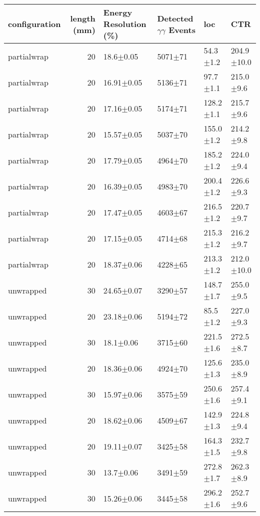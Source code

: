 \begin{tabular}{lrllll}
\hline
configuration &  length (mm) & Energy Resolution (\%) & Detected $\gamma\gamma$ Events &             loc &             CTR \\
\hline
  partialwrap &      20 &    18.6$\pm$0.05 &  5071$\pm$71 &    54.3$\pm$1.2 &  204.9$\pm$10.0 \\
  partialwrap &      20 &   16.91$\pm$0.05 &  5136$\pm$71 &    97.7$\pm$1.1 &   215.0$\pm$9.6 \\
  partialwrap &      20 &   17.16$\pm$0.05 &  5174$\pm$71 &   128.2$\pm$1.1 &   215.7$\pm$9.6 \\
  partialwrap &      20 &   15.57$\pm$0.05 &  5037$\pm$70 &   155.0$\pm$1.2 &   214.2$\pm$9.8 \\
  partialwrap &      20 &   17.79$\pm$0.05 &  4964$\pm$70 &   185.2$\pm$1.2 &   224.0$\pm$9.4 \\
  partialwrap &      20 &   16.39$\pm$0.05 &  4983$\pm$70 &   200.4$\pm$1.2 &   226.6$\pm$9.3 \\
  partialwrap &      20 &   17.47$\pm$0.05 &  4603$\pm$67 &   216.5$\pm$1.2 &   220.7$\pm$9.7 \\
  partialwrap &      20 &   17.15$\pm$0.05 &  4714$\pm$68 &   215.3$\pm$1.2 &   216.2$\pm$9.7 \\
  partialwrap &      20 &   18.37$\pm$0.06 &  4228$\pm$65 &   213.3$\pm$1.2 &  212.0$\pm$10.0 \\
    unwrapped &      30 &   24.65$\pm$0.07 &  3290$\pm$57 &   148.7$\pm$1.7 &   255.0$\pm$9.5 \\
    unwrapped &      20 &   23.18$\pm$0.06 &  5194$\pm$72 &    85.5$\pm$1.2 &   227.0$\pm$9.3 \\
    unwrapped &      30 &    18.1$\pm$0.06 &  3715$\pm$60 &   221.5$\pm$1.6 &   272.5$\pm$8.7 \\
    unwrapped &      20 &   18.36$\pm$0.06 &  4924$\pm$70 &   125.6$\pm$1.3 &   235.0$\pm$8.9 \\
    unwrapped &      30 &   15.97$\pm$0.06 &  3575$\pm$59 &   250.6$\pm$1.6 &   257.4$\pm$9.1 \\
    unwrapped &      20 &   18.62$\pm$0.06 &  4509$\pm$67 &   142.9$\pm$1.3 &   224.8$\pm$9.4 \\
    unwrapped &      20 &   19.11$\pm$0.07 &  3425$\pm$58 &   164.3$\pm$1.5 &   232.7$\pm$9.8 \\
    unwrapped &      30 &    13.7$\pm$0.06 &  3491$\pm$59 &   272.8$\pm$1.7 &   262.3$\pm$8.9 \\
    unwrapped &      30 &   15.26$\pm$0.06 &  3445$\pm$58 &   296.2$\pm$1.6 &   252.7$\pm$9.6 \\

\end{tabular}
